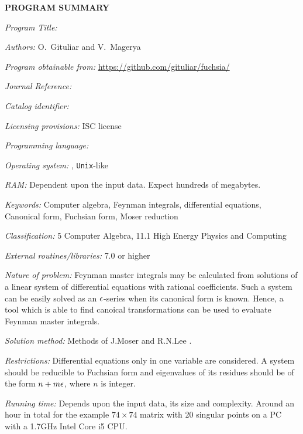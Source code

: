 {\bf PROGRAM SUMMARY}

\begin{small}
\noindent

{\em Program Title:}
    \fuchsia

{\em Authors:}
    O.~Gituliar and V.~Magerya

{\em Program obtainable from:}
    \url{https://github.com/gituliar/fuchsia/}

{\em Journal Reference:}

{\em Catalog identifier:}

{\em Licensing provisions:}
    ISC license

{\em Programming language:}

{\em Operating system:}
    \linux, \texttt{Unix}-like

{\em RAM:}
    Dependent upon the input data. Expect hundreds of megabytes.

{\em Keywords:}
    Computer algebra, Feynman integrals, differential equations, Canonical form, Fuchsian form, Moser reduction

{\em Classification:}
    5 Computer Algebra, 11.1 High Energy Physics and Computing

{\em External routines/libraries:}
    \href{http://www.sagemath.org/}{\sage} 7.0 or higher

{\em Nature of problem:}
    Feynman master integrals may be calculated from solutions of a linear system of differential equations with rational coefficients.
    Such a system can be easily solved as an $\epsilon$-series when its canonical form is known.
    Hence, a tool which is able to find canoical transformations can be used to evaluate Feynman master integrals. 

{\em Solution method:}
    Methods of J.Moser \cite{Mos59} and R.N.Lee \cite{Lee15}.

{\em Restrictions:}
    Differential equations only in one variable are considered.
    A system should be reducible to Fuchsian form and eigenvalues of its residues should be of the form $n + m \epsilon$, where $n$ is integer.

{\em Running time:}
    Depends upon the input data, its size and complexity.
    Around an hour in total for the example $74\times74$ matrix with 20 singular points on a PC with a 1.7GHz Intel Core i5 CPU.

\end{small}
